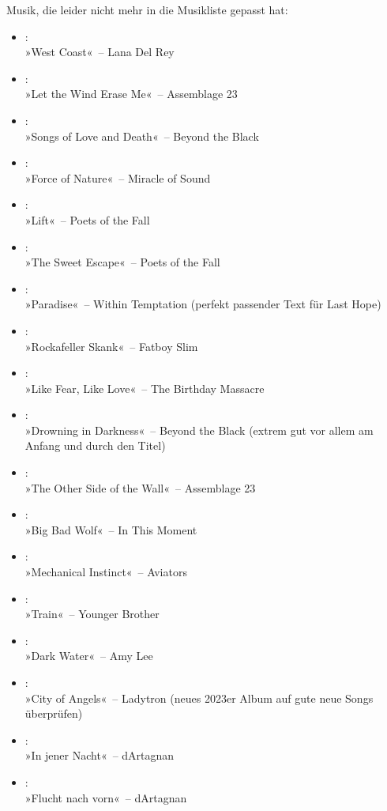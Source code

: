 Musik, die leider nicht mehr in die Musikliste gepasst hat:

\begin{itemize}
    \item :\\ »West Coast«~– Lana Del Rey
    \item :\\ »Let the Wind Erase Me«~– Assemblage 23
    \item :\\ »Songs of Love and Death«~– Beyond the Black
    \item :\\ »Force of Nature«~– Miracle of Sound
    \item :\\ »Lift«~– Poets of the Fall
    \item :\\ »The Sweet Escape«~– Poets of the Fall
    \item :\\ »Paradise«~– Within Temptation (perfekt passender Text für Last Hope)
    \item :\\ »Rockafeller Skank«~– Fatboy Slim
    \item :\\ »Like Fear, Like Love«~– The Birthday Massacre
    \item :\\ »Drowning in Darkness«~– Beyond the Black (extrem gut vor allem am Anfang und durch den Titel)
    \item :\\ »The Other Side of the Wall«~– Assemblage 23
    \item :\\ »Big Bad Wolf«~– In This Moment
    \item :\\ »Mechanical Instinct«~– Aviators
    \item :\\ »Train«~– Younger Brother
    \item :\\ »Dark Water«~– Amy Lee
    \item :\\ »City of Angels«~– Ladytron (neues 2023er Album auf gute neue Songs überprüfen)
    \item :\\ »In jener Nacht«~– dArtagnan
    \item :\\ »Flucht nach vorn«~– dArtagnan

\end{itemize}
